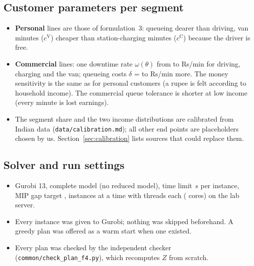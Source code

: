 \subsection{Customer parameters per segment}
\begin{table}[H]
\centering\small
\caption{Customer parameters of the run (straight lines between $\theta=0$ and $\theta=1$, per segment; \texttt{common/f4\_params.json}).}
\label{tab:params}

\end{table}
\begin{itemize}
  \item \textbf{Personal} lines are those of formulation~3: queueing dearer than driving, van minutes ($c^{\mathrm V}$) cheaper than station-charging minutes ($c^{\mathrm C}$) because the driver is free.
  \item \textbf{Commercial} lines: one downtime rate $\omega(\theta)$ from \OmegaZero{} to \OmegaOne{} Rs/min for driving, charging and the van; queueing costs $\delta$ = \DeltaZero{} to \DeltaOne{} Rs/min more. The money sensitivity is the same as for personal customers (a rupee is felt according to household income). The commercial queue tolerance is shorter at low income (every minute is lost earnings).
  \item The segment share and the two income distributions are calibrated from Indian data (\texttt{data/calibration.md}); all other end points are placeholders chosen by us. Section~\ref{sec:calibration} lists sources that could replace them.
\end{itemize}

\subsection{Solver and run settings}
\begin{itemize}
  \item Gurobi 13, complete model (no reduced model), time limit \TimeLimit\,s per instance, MIP gap target \MipGap\pct, \Workers{} instances at a time with \Threads{} threads each (\Cores{} cores) on the lab server.
  \item Every instance was given to Gurobi; nothing was skipped beforehand. A greedy plan was offered as a warm start when one existed.
  \item Every plan was checked by the independent checker (\texttt{common/check\_plan\_f4.py}), which recomputes $Z$ from scratch.
\end{itemize}

